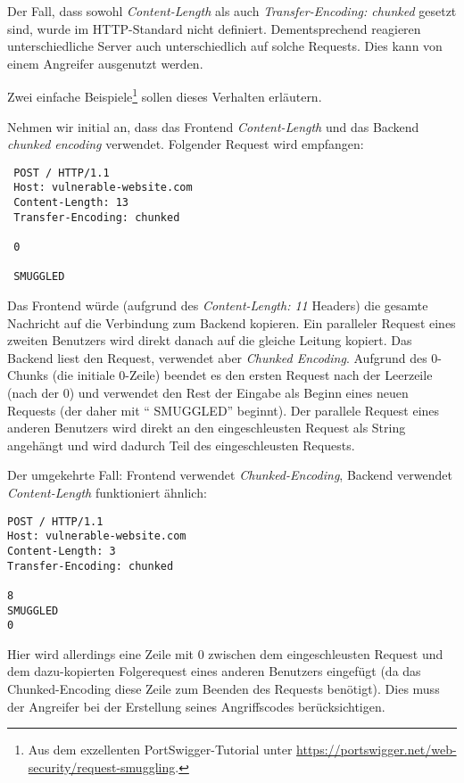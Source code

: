 Der Fall, dass sowohl \textit{Content-Length} als auch \textit{Transfer-Encoding: chunked} gesetzt sind, wurde im HTTP-Standard nicht definiert. Dementsprechend reagieren unterschiedliche Server auch unterschiedlich auf solche Requests. Dies kann von einem Angreifer ausgenutzt werden.

Zwei einfache Beispiele\footnote{Aus dem exzellenten PortSwigger-Tutorial unter \url{https://portswigger.net/web-security/request-smuggling}.} sollen dieses Verhalten erläutern.

Nehmen wir initial an, dass das Frontend \textit{Content-Length} und das Backend \textit{chunked encoding} verwendet. Folgender Request wird empfangen:

\begin{verbatim}
 POST / HTTP/1.1
 Host: vulnerable-website.com
 Content-Length: 13
 Transfer-Encoding: chunked

 0

 SMUGGLED 
\end{verbatim}

Das Frontend würde (aufgrund des \textit{Content-Length: 11} Headers) die gesamte Nachricht auf die Verbindung zum Backend kopieren. Ein paralleler Request eines zweiten Benutzers wird direkt danach auf die gleiche Leitung kopiert. Das Backend liest den Request, verwendet aber \textit{Chunked Encoding}. Aufgrund des 0-Chunks (die initiale 0-Zeile) beendet es den ersten Request nach der Leerzeile (nach der 0) und verwendet den Rest der Eingabe als Beginn eines neuen Requests (der daher mit `` SMUGGLED'' beginnt). Der parallele Request eines anderen Benutzers wird direkt an den eingeschleusten Request als String angehängt und wird dadurch Teil des eingeschleusten Requests.

Der umgekehrte Fall: Frontend verwendet \textit{Chunked-Encoding}, Backend verwendet \textit{Content-Length} funktioniert ähnlich:

\begin{verbatim}
POST / HTTP/1.1
Host: vulnerable-website.com
Content-Length: 3
Transfer-Encoding: chunked

8
SMUGGLED
0
\end{verbatim}

Hier wird allerdings eine Zeile mit 0 zwischen dem eingeschleusten Request und dem dazu-kopierten Folgerequest eines anderen Benutzers eingefügt (da das Chunked-Encoding diese Zeile zum Beenden des Requests benötigt). Dies muss der Angreifer bei der Erstellung seines Angriffscodes berücksichtigen.

